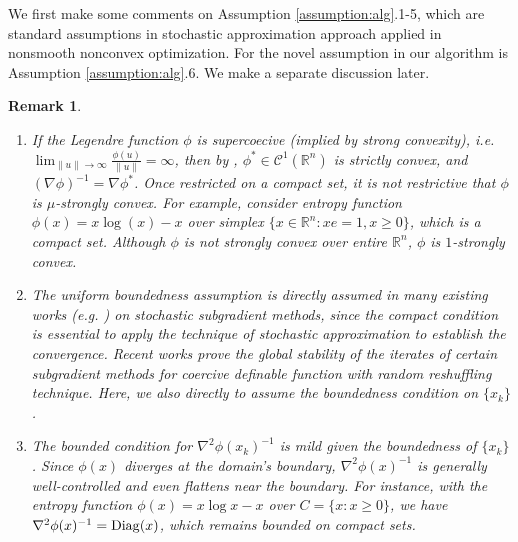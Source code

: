 \documentclass[11pt]{article}
\newcommand{\R}{\mathbb R}
\newcommand{\cC}{\mathcal C}
\newtheorem{remark}{Remark}[section]
\begin{document}
We first make some comments on Assumption \ref{assumption:alg}.1-5, which are standard assumptions in stochastic approximation approach applied in nonsmooth nonconvex optimization. For the novel assumption in our algorithm is Assumption \ref{assumption:alg}.6. We make a separate discussion later.
\begin{remark}
    \label{rmk:assumption_DI}
    \begin{enumerate}
        \item If the Legendre function $\phi$ is supercoecive (implied by strong convexity), i.e. $\lim_{\|u\|\rightarrow\infty}\frac{\phi(u)}{\|u\|}=\infty$, then by \cite[Theorem 26.5,\,Corollary 13.3.1]{rockafellar1997convex}, $\phi^*\in\cC^1(\R^n)$ is strictly convex, and $(\nabla\phi)^{-1}=\nabla\phi^*$. Once restricted on a compact set, it is not restrictive that $\phi$ is $\mu$-strongly convex. For example, consider entropy function $\phi(x)=x\log(x)-x$ over simplex $\{x\in\R^n:xe=1,x\geq0\}$, which is a compact set. Although $\phi$ is not strongly convex over entire $\R^n$, $\phi$ is $1$-strongly convex.
        \item The uniform boundedness assumption is directly assumed in many existing works (e.g. \cite{davis2020stochastic,castera2021inertial,xiao2023adam}) on stochastic subgradient methods, since the compact condition is essential to apply the technique of stochastic approximation \cite{benaim2005stochastic,borkar2009stochastic} to establish the convergence. Recent works \cite{josz2024global,xiao2023convergence} prove the global stability of the iterates of certain subgradient methods for coercive definable function with random reshuffling technique. Here, we also directly to assume the boundedness condition on $\{x_k\}$. 
        \item The bounded condition for $\nabla^2\phi(x_k)^{-1}$ is mild given the boundedness of $\{x_k\}$. Since $\phi(x)$ diverges at the domain’s boundary, $\nabla^2 \phi(x)^{-1}$ is generally well-controlled and even flattens near the boundary. For instance, with the entropy function $\phi(x) = x \log x - x$ over $C = \{x : x \geq 0\}$, we have $\nabla^2 \phi(x)^{-1} = {\rm Diag}(x)$, which remains bounded on compact sets.


\end{enumerate}
\end{remark}
\end{document}
